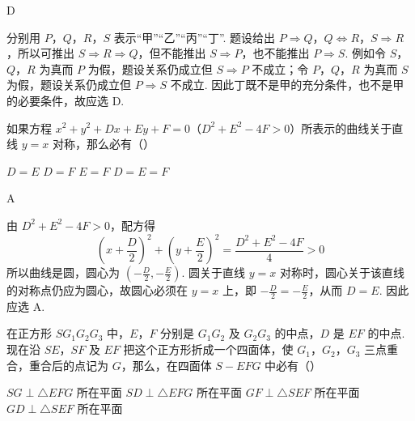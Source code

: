 \begin{answer}
D
\end{answer}

\begin{solution}
分别用 \(P\)，\(Q\)，\(R\)，\(S\) 表示“甲”“乙”“丙”“丁”. 题设给出 \(P\Rightarrow Q\)，\(Q\Leftrightarrow R\)，\(S\Rightarrow R\)，所以可推出 \(S\Rightarrow R\Rightarrow Q\)，但不能推出 \(S\Rightarrow P\)，也不能推出 \(P\Rightarrow S\). 例如令 \(S\)，\(Q\)，\(R\) 为真而 \(P\) 为假，题设关系仍成立但 \(S\Rightarrow P\) 不成立；令 \(P\)，\(Q\)，\(R\) 为真而 \(S\) 为假，题设关系仍成立但 \(P\Rightarrow S\) 不成立. 因此丁既不是甲的充分条件，也不是甲的必要条件，故应选 D.
\end{solution}

\begin{problem}

如果方程 \(x^2 + y^2 + Dx + Ey + F = 0\)（\(D^2 + E^2 - 4F > 0\)）所表示的曲线关于直线 \(y = x\) 对称，那么必有（\quad）

\choices
    {\(D = E\)}
    {\(D = F\)}
    {\(E = F\)}
    {\(D = E = F\)}
\end{problem}

\begin{answer}
A
\end{answer}

\begin{solution}
由 \(D^2+E^2-4F>0\)，配方得
\[
\left(x+\frac{D}{2}\right)^2+\left(y+\frac{E}{2}\right)^2=\frac{D^2+E^2-4F}{4}>0
\]
所以曲线是圆，圆心为 \((-\frac{D}{2},-\frac{E}{2})\). 圆关于直线 \(y=x\) 对称时，圆心关于该直线的对称点仍应为圆心，故圆心必须在 \(y=x\) 上，即 \(-\frac{D}{2}=-\frac{E}{2}\)，从而 \(D=E\). 因此应选 A.
\end{solution}

\begin{problem}

在正方形 \(SG_1G_2G_3\) 中，\(E\)，\(F\) 分别是 \(G_1G_2\) 及 \(G_2G_3\) 的中点，\(D\) 是 \(EF\) 的中点. 现在沿 \(SE\)，\(SF\) 及 \(EF\) 把这个正方形折成一个四面体，使 \(G_1\)，\(G_2\)，\(G_3\) 三点重合，重合后的点记为 \(G\)，那么，在四面体 \(S - EFG\) 中必有（\quad）


\choices
    {\(SG \perp \triangle EFG\) 所在平面}
    {\(SD \perp \triangle EFG\) 所在平面}
    {\(GF \perp \triangle SEF\) 所在平面}
    {\(GD \perp \triangle SEF\) 所在平面}
\end{problem}

